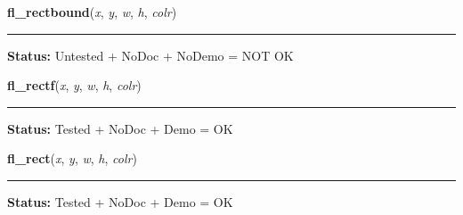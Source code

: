     \vspace{0.5ex}

\hspace{.8\funcindent}\begin{boxedminipage}{\funcwidth}

    \raggedright \textbf{fl\_rectbound}(\textit{x}, \textit{y}, \textit{w}, \textit{h}, \textit{colr})

    \vspace{-1.5ex}

    \rule{\textwidth}{0.5\fboxrule}
\setlength{\parskip}{2ex}
\setlength{\parskip}{1ex}
\textbf{Status:} Untested + NoDoc + NoDemo = NOT OK



    \end{boxedminipage}

    \label{xformslib:library:fl_rectf}

    \vspace{0.5ex}

\hspace{.8\funcindent}\begin{boxedminipage}{\funcwidth}

    \raggedright \textbf{fl\_rectf}(\textit{x}, \textit{y}, \textit{w}, \textit{h}, \textit{colr})

    \vspace{-1.5ex}

    \rule{\textwidth}{0.5\fboxrule}
\setlength{\parskip}{2ex}
\setlength{\parskip}{1ex}
\textbf{Status:} Tested + NoDoc + Demo = OK



    \end{boxedminipage}

    \label{xformslib:library:fl_rect}

    \vspace{0.5ex}

\hspace{.8\funcindent}\begin{boxedminipage}{\funcwidth}

    \raggedright \textbf{fl\_rect}(\textit{x}, \textit{y}, \textit{w}, \textit{h}, \textit{colr})

    \vspace{-1.5ex}

    \rule{\textwidth}{0.5\fboxrule}
\setlength{\parskip}{2ex}
\setlength{\parskip}{1ex}
\textbf{Status:} Tested + NoDoc + Demo = OK



    \end{boxedminipage}

